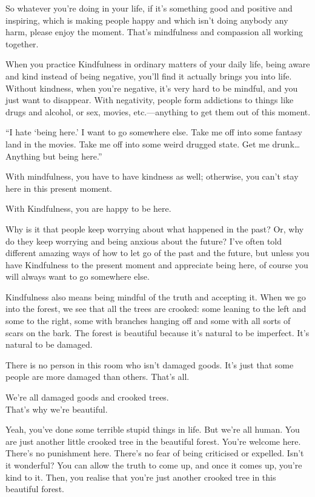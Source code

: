 \documentclass[12pt, openany]{book}
\newenvironment{aphorism}%
{%
\begin{center}\begin{itshape}
}%
{\end{itshape}\end{center}
}%
\begin{document}
So whatever you’re doing in your life, if it’s something good and positive and inspiring, which is making people happy and which isn’t doing anybody any harm, please enjoy the moment. That’s mindfulness and compassion all working together. 

When you practice Kindfulness in ordinary matters of your daily life, being aware and kind instead of being negative, you’ll find it actually brings you into life. Without kindness, when you’re negative, it’s very hard to be mindful, and you just want to disappear. With negativity, people form addictions to things like drugs and alcohol, or sex, movies, etc.—anything to get them out of this moment. 

“I hate ‘being here.’ I want to go somewhere else. Take me off into some fantasy land in the movies. Take me off into some weird drugged state. Get me drunk… Anything but being here.” 

With mindfulness, you have to have kindness as well; otherwise, you can’t stay here in this present moment. 

\begin{aphorism}
With Kindfulness, you are happy to be here.
\end{aphorism}

Why is it that people keep worrying about what happened in the past? Or, why do they keep worrying and being anxious about the future? I’ve often told different amazing ways of how to let go of the past and the future, but unless you have Kindfulness to the present moment and appreciate being here, of course you will always want to go somewhere else. 

Kindfulness also means being mindful of the truth and accepting it. When we go into the forest, we see that all the trees are crooked: some leaning to the left and some to the right, some with branches hanging off and some with all sorts of scars on the bark. The forest is beautiful because it’s natural to be imperfect. It’s natural to be damaged. 

There is no person in this room who isn’t damaged goods. It’s just that some people are more damaged than others. That’s all. 

\begin{aphorism}
We’re all damaged goods and crooked trees.\\  
That’s why we’re beautiful.
\end{aphorism}

Yeah, you’ve done some terrible stupid things in life. But we’re all human. You are just another little crooked tree in the beautiful forest. You’re welcome here. There’s no punishment here. There’s no fear of being criticised or expelled. Isn’t it wonderful? You can allow the truth to come up, and once it comes up, you’re kind to it. Then, you realise that you’re just another crooked tree in this beautiful forest. 
\end{document}
